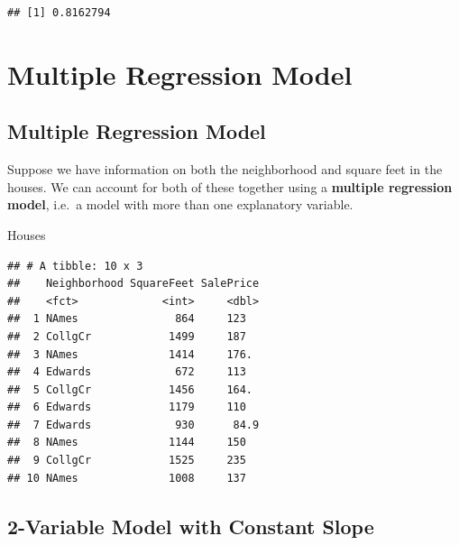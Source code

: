 \documentclass[]{book}
\newenvironment{Shaded}{\begin{snugshade}}{\end{snugshade}}
\newcommand{\KeywordTok}[1]{\textcolor[rgb]{0.13,0.29,0.53}{\textbf{#1}}}
\newcommand{\OperatorTok}[1]{\textcolor[rgb]{0.81,0.36,0.00}{\textbf{#1}}}
\newcommand{\NormalTok}[1]{#1}
\begin{document}
\begin{Shaded}
\end{Shaded}

\begin{verbatim}
## [1] 0.8162794
\end{verbatim}

\section{Multiple Regression Model}\label{multiple-regression-model}

\subsection{Multiple Regression
Model}\label{multiple-regression-model-1}

Suppose we have information on both the neighborhood and square feet in
the houses. We can account for both of these together using a
\textbf{multiple regression model}, i.e.~a model with more than one
explanatory variable.

\begin{Shaded}
\begin{Highlighting}[]
\NormalTok{Houses}
\end{Highlighting}
\end{Shaded}

\begin{verbatim}
## # A tibble: 10 x 3
##    Neighborhood SquareFeet SalePrice
##    <fct>             <int>     <dbl>
##  1 NAmes               864     123  
##  2 CollgCr            1499     187  
##  3 NAmes              1414     176. 
##  4 Edwards             672     113  
##  5 CollgCr            1456     164. 
##  6 Edwards            1179     110  
##  7 Edwards             930      84.9
##  8 NAmes              1144     150  
##  9 CollgCr            1525     235  
## 10 NAmes              1008     137
\end{verbatim}

\subsection{2-Variable Model with Constant
Slope}\label{variable-model-with-constant-slope}
\end{document}
